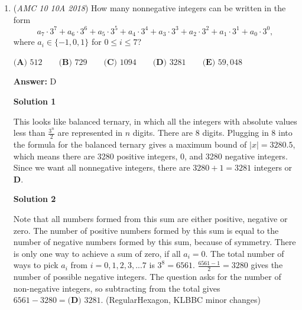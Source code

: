 \begin{enumerate}
 We try 3 next. Our set becomes $\{3,4,5,7,11\}$. We run into the same issue as before so starting with 3 won't work.

 We then try 4. Our set becomes $\{4,5,6,7,9,11\}$. We see we have 6 elements with none being multiples of each other. Therefore our answer is $\boxed{\textbf{(C)}\ 4}.$




\textbf{Solution 6}

We see we want to get $6$ elements that are close to each other as this means that there is a high probability one is not a multiple fo the other. We see $4$ and the integers following create a possibility that works so the answer is $\boxed{C}$.~jamespudi

 


	\item (\textit{AMC 10 10A 2018}) How many nonnegative integers can be written in the form 
 \[a_7\cdot3^7+a_6\cdot3^6+a_5\cdot3^5+a_4\cdot3^4+a_3\cdot3^3+a_2\cdot3^2+a_1\cdot3^1+a_0\cdot3^0,\]
where $a_i\in \{-1,0,1\}$ for $0\le i \le 7$?


 $\textbf{(A) } 512 \qquad  \textbf{(B) } 729 \qquad  \textbf{(C) } 1094 \qquad  \textbf{(D) } 3281 \qquad  \textbf{(E) } 59,048$

 \textbf{Answer: }D



\textbf{Solution 1}

This looks like balanced ternary, in which all the integers with absolute values less than $\frac{3^n}{2}$ are represented in $n$ digits. There are 8 digits. Plugging in 8 into the formula for the balanced ternary gives a maximum bound of $|x|=3280.5$, which means there are 3280 positive integers, 0, and 3280 negative integers. Since we want all nonnegative integers, there are $3280+1=\boxed{3281}$ integers or $\boxed{\textbf{D}}$.

 



\textbf{Solution 2}

Note that all numbers formed from this sum are either positive, negative or zero. The number of positive numbers formed by this sum is equal to the number of negative numbers formed by this sum, because of symmetry. There is only one way to achieve a sum of zero, if all $a_i=0$. The total number of ways to pick $a_i$ from $i=0, 1, 2, 3, ... 7$ is $3^8=6561$. $\frac{6561-1}{2}=3280$ gives the number of possible negative integers. The question asks for the number of non-negative integers, so subtracting from the total gives $6561-3280=\boxed{\textbf{(D) } 3281}$. (RegularHexagon, KLBBC minor changes)


\end{enumerate}
